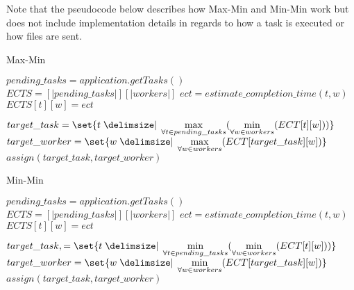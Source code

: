 \onecolumn
\appendix
Note that the pseudocode  below describes how Max-Min and Min-Min work but does not include implementation details in regards to how
a task is executed or how files are sent. 

\begin{algorithm}[H]
  \renewcommand{\thealgorithm}{}
  \caption{Max-Min}
  \begin{algorithmic}
      \STATE $pending\_tasks = application.getTasks()$
          \STATE $ECTS = [|pending\_tasks|][|workers|]$
              \STATE $ect = estimate\_completion\_time(t, w)$
              \STATE $ECTS[t][w] = ect$
            \ENDFOR
          \ENDFOR

          \STATE $target\_task = \set{t \given \max\limits_{\forall t \in pending\_tasks} (\min\limits_{\forall w
          \in workers}(ECT[t][w]))}$
          \STATE $target\_worker = \set{w \given \max\limits_{\forall w \in workers}(ECT[target\_task][w])}$
          \STATE $assign(target\_task, target\_worker)$

        \ENDIF
      \ENDWHILE
  \end{algorithmic}
\end{algorithm}

\begin{algorithm}[H]
  \renewcommand{\thealgorithm}{}
  \caption{Min-Min}
  \begin{algorithmic}
      \STATE $pending\_tasks = application.getTasks()$
          \STATE $ECTS = [|pending\_tasks|][|workers|]$
              \STATE $ect = estimate\_completion\_time(t, w)$
              \STATE $ECTS[t][w] = ect$
            \ENDFOR
          \ENDFOR

          \STATE $target\_task, = \set{t \given \min\limits_{\forall t \in pending\_tasks} (\min\limits_{\forall w
          \in workers}(ECT[t][w]))}$
          \STATE $target\_worker = \set{w \given \min\limits_{\forall w \in workers}(ECT[target\_task][w])}$
          \STATE $assign(target\_task, target\_worker)$

        \ENDIF
      \ENDWHILE
  \end{algorithmic}
\end{algorithm}
